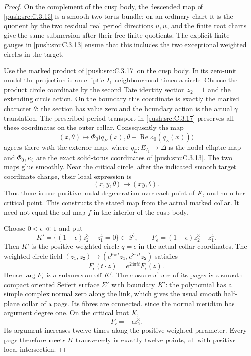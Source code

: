 \begin{proof}
On the complement of the cusp body, the descended map of \ref{push:src:C.3.13}
is a smooth two-torus bundle: on an ordinary chart it is the
quotient by the two residual real period directions $u,w$,
and the finite root charts give the same submersion after their
free finite quotients. The explicit finite gauges in \ref{push:src:C.3.13}
ensure that this includes the two exceptional weighted circles
in the target.

Use the marked product of \ref{push:src:C.3.17} on the cusp body. In its
zero-unit model the projection is an elliptic $I_1$ neighbourhood
times a circle. Choose the product circle coordinate by the
second Tate identity section $z_2=1$ and the extending circle
action. On the boundary this coordinate is exactly the marked
character $\theta$: the section has value zero and the boundary
action is the actual $\gamma$ translation. The prescribed period
transport in \ref{push:src:C.3.17} preserves all these coordinates on the
outer collar. Consequently the map
\[
 (x,\theta)\longmapsto
 \Phi_0\bigl(q_E(x),\theta-\operatorname{Re}\kappa_0(q_E(x))\bigr)
\]
agrees there with the exterior map, where $q_E:E_{I_1}\to\Delta$
is the nodal elliptic map and $\Phi_0,\kappa_0$ are the exact
solid-torus coordinates of \ref{push:src:C.3.13}. The two maps glue smoothly.
Near the critical circle, after the indicated smooth target
coordinate change, their local expression is
\[
 (x,y,\theta)\longmapsto(xy,\theta).
\]
Thus there is one positive nodal degeneration over each point
of $K$, and no other critical point. This constructs the stated
map from the actual marked collar. It need not equal the old
map $\overline f$ in the interior of the cusp body.

Choose $0<\epsilon\ll1$ and put
\[
 K'=\{(1-\epsilon)z_2^3-z_1^4=0\}\subset S^3,
 \qquad F_\epsilon=(1-\epsilon)z_2^3-z_1^4.
\]
Then $K'$ is the positive weighted circle $q=\epsilon$ in
the actual collar coordinates. The weighted circle field
$(z_1,z_2)\mapsto(e^{6\pi it}z_1,e^{8\pi it}z_2)$ satisfies
\[
 F_\epsilon(t\cdot z)=e^{24\pi it}F_\epsilon(z).
\]
Hence $\arg F_\epsilon$ is a submersion off $K'$. The closure
of one of its pages is a smooth compact oriented Seifert
surface $\Sigma'$ with boundary $K'$: the polynomial has a
simple complex normal zero along the link, which gives the
usual smooth half-plane collar of a page. Its fibres are
connected, since the normal meridian has argument degree one.
On the critical knot $K$,
\[
 F_\epsilon=-\epsilon z_2^3.
\]
Its argument increases twelve times along the positive weighted
parameter. Every page therefore meets $K$ transversely in
exactly twelve points, all with positive local intersection.


\end{proof}

